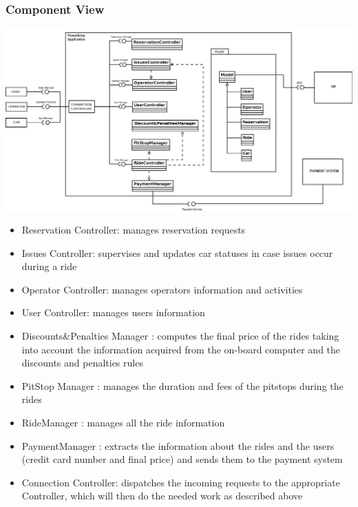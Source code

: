 \documentclass{article}
\begin{document}
\begin{flushleft}
\break
\subsubsection{Component View}
 
\vspace{0.5cm}

\includegraphics[scale=0.3]{component} 

\vspace{0.5cm}
\begin {itemize}
\item Reservation Controller: manages reservation requests
\item Issues Controller:  supervises  and updates car statuses in case issues occur during a ride
\item Operator Controller: manages operators information and activities
\item User Controller: manages users information 
\item Discounts\&Penalties Manager : computes the final price of the rides  taking into account the information acquired from the on-board computer and the discounts and penalties rules
\item PitStop Manager : manages the duration and fees of the pitstops during the rides 
\item RideManager : manages all the ride information
\item PaymentManager : extracts the information about the rides and the users (credit card number and final price) and sends them to the payment system
\item Connection Controller: dispatches the incoming requests to the appropriate Controller, which will then do the needed work as described above

\end{itemize}



\end{flushleft}
\end{document}
